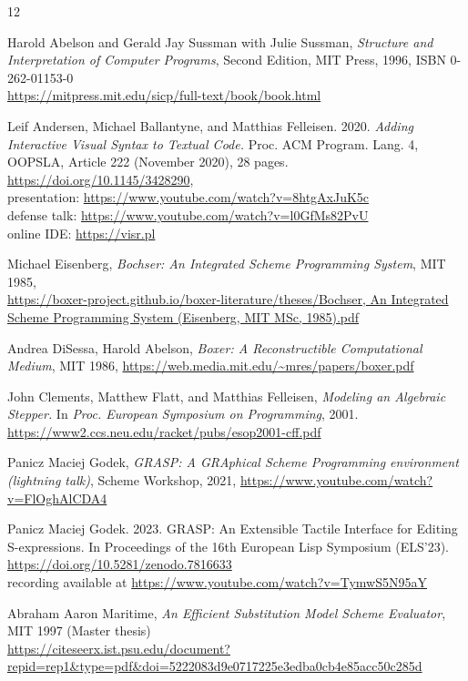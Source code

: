 \documentclass[acmsmall,nonacm]{acmart}
\begin{document}
\begin{thebibliography}{12}

  Harold Abelson and Gerald Jay Sussman with Julie Sussman,
  \emph{Structure and Interpretation of Computer Programs},
  Second Edition, MIT Press, 1996, ISBN 0-262-01153-0 \\
  \url{https://mitpress.mit.edu/sicp/full-text/book/book.html}
  
 Leif Andersen, Michael Ballantyne, and Matthias
  Felleisen. 2020. \emph{Adding Interactive Visual Syntax to Textual
  Code.} Proc. ACM Program. Lang. 4, OOPSLA, Article 222 (November
  2020), 28 pages. \url{https://doi.org/10.1145/3428290}, \\
  presentation: \url{https://www.youtube.com/watch?v=8htgAxJuK5c} \\ 
  defense talk: \url{https://www.youtube.com/watch?v=l0GfMs82PvU} \\
  online IDE: \url{https://visr.pl}

Michael Eisenberg, \emph{Bochser: An Integrated Scheme Programming System},
  MIT 1985, \\
  \url{https://boxer-project.github.io/boxer-literature/theses/Bochser, An Integrated Scheme Programming System (Eisenberg, MIT MSc, 1985).pdf}
  
  Andrea DiSessa, Harold Abelson,
  \emph{Boxer: A Reconstructible Computational Medium},
  MIT 1986, \url{https://web.media.mit.edu/~mres/papers/boxer.pdf}

  John Clements, Matthew Flatt, and Matthias Felleisen,
  \emph{Modeling an Algebraic Stepper.} In \emph{Proc. European
  Symposium on Programming}, 2001. \\
  \url{https://www2.ccs.neu.edu/racket/pubs/esop2001-cff.pdf}
  
 Panicz Maciej Godek, \emph{GRASP: A GRAphical
Scheme Programming environment (lightning talk)}, Scheme Workshop,
  2021, \url{https://www.youtube.com/watch?v=FlOghAlCDA4}

 Panicz Maciej Godek. 2023. GRASP: An Extensible
  Tactile Interface for Editing S-expressions. In Proceedings of the
  16th European Lisp Symposium (ELS’23). 
  \url{https://doi.org/10.5281/zenodo.7816633} \\ recording
  available at \url{https://www.youtube.com/watch?v=TymwS5N95aY}

 Abraham Aaron Maritime, \emph{An Efficient
Substitution Model Scheme Evaluator}, MIT 1997 (Master thesis)\\
  \url{https://citeseerx.ist.psu.edu/document?repid=rep1&type=pdf&doi=5222083d9e0717225e3edba0cb4e85acc50c285d}


\end{thebibliography}
\end{document}
